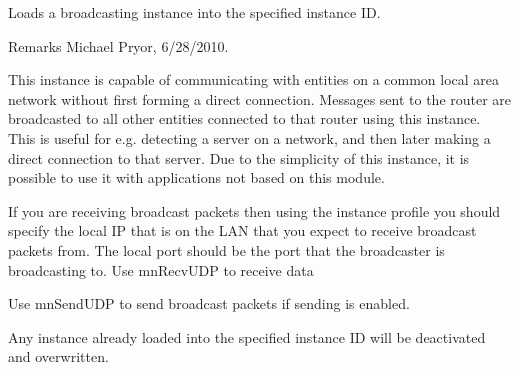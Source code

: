 \label{group__proc_commands_ga6d38ae0c7de397bc81d86c4dc89690aa}
Loads a broadcasting instance into the specified instance ID. \begin{DoxyRemark}{Remarks}
Michael Pryor, 6/28/2010.
\end{DoxyRemark}
This instance is capable of communicating with entities on a common local area network without first forming a direct connection. Messages sent to the router are broadcasted to all other entities connected to that router using this instance. This is useful for e.g. detecting a server on a network, and then later making a direct connection to that server. Due to the simplicity of this instance, it is possible to use it with applications not based on this module. 

If you are receiving broadcast packets then using the instance profile you should specify the local IP that is on the LAN that you expect to receive broadcast packets from. The local port should be the port that the broadcaster is broadcasting to. Use mnRecvUDP to receive data\par
\par


Use mnSendUDP to send broadcast packets if sending is enabled.\par
\par


Any instance already loaded into the specified instance ID will be deactivated and overwritten.


